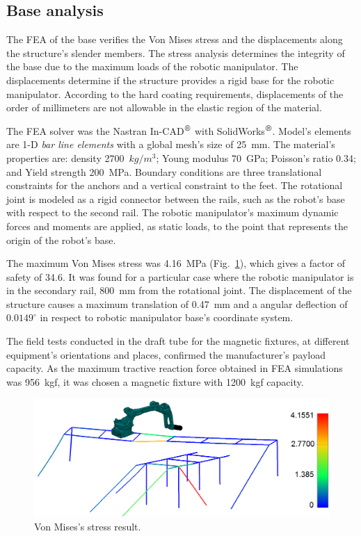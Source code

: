\subsection{Base analysis}

The FEA of the base verifies the Von Mises stress and the displacements
along the structure's slender members. The stress analysis determines the
integrity of the base due to the maximum loads of the robotic manipulator. The
displacements determine if the structure provides a rigid base for the robotic
manipulator. According to the hard coating requirements, displacements of the
order of millimeters are not allowable in the elastic region of the
material. 

The FEA solver was the Nastran In-CAD$^{\mbox{\small\textregistered}}$ with
SolidWorks$^{\mbox{\small\textregistered}}$. Model's elements are 1-D 
\textit{bar line elements} with a global mesh's size of 25~mm. The material's
properties are: density 2700~$kg/m^3$; Young modulus 70~GPa; Poisson's ratio
0.34; and Yield strength 200~MPa. Boundary conditions are three translational
constraints for the anchors and a vertical constraint to the feet. The
rotational joint is modeled as a rigid connector between the rails, such as the
robot's base with respect to the second rail. The robotic manipulator's maximum
dynamic forces and moments are applied, as static loads, to the point that
represents the origin of the robot's base.

The maximum Von Mises stress was 4.16~MPa (Fig.~\ref{fig:von_mises}), which
gives a factor of safety of 34.6. It was found for a particular case where the robotic manipulator is in
the secondary rail, 800~mm from the rotational joint. The displacement of the
structure causes a maximum translation of 0.47~mm and a angular deflection of
$0.0149^{\circ}$ in respect to robotic manipulator base's coordinate system. 

The field tests conducted in the draft tube for the magnetic fixtures, at
different equipment's orientations and places, confirmed the manufacturer's
payload capacity. As the maximum tractive reaction force obtained in FEA
simulations was 956~kgf, it was chosen a magnetic fixture with 1200~kgf
capacity.

\begin{figure}
	\centering
	\includegraphics[width=.95\columnwidth]{figs/mecanica/von_mises.png}
    \caption{Von Mises's stress result.}
    \label{fig:von_mises}
\end{figure}

